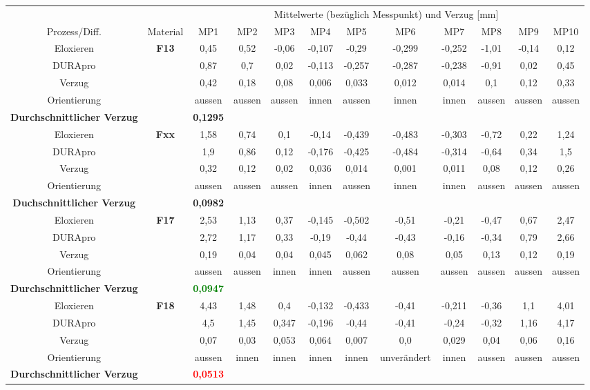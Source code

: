 \documentclass[12pt,a4paper,parskip,twoside,BCOR5mm,headsepline]{scrartcl}
\begin{document}
\begin{description*}
\begin{table}
\begin{tabular}{cccccccccccc}
\toprule
&& \multicolumn{10}{c}{Mittelwerte (bezüglich Messpunkt) und Verzug [\si{\milli\meter}]} \\
\cmidrule(2){3-12}
Prozess/Diff. & Material & MP1 & MP2 & MP3 & MP4 & MP5 & MP6 & MP7 & MP8 & MP9 & MP10 \\
\midrule
Eloxieren & \textbf{F13} &0,45 &0,52  &-0,06  &-0,107  &-0,29  &-0,299  &-0,252  &-1,01  &-0,14  &0,12  \\
DURApro &&0,87  &0,7  &0,02  &-0,113  &-0,257  & -0,287 &-0,238  &-0,91  &0,02  &0,45  \\
Verzug &&0,42  & 0,18 &0,08  &0,006  &0,033  &0,012  &0,014  &0,1  & 0,12 &0,33  \\
Orientierung &&aussen &aussen  &aussen  &innen  & aussen &innen  & innen &aussen  &aussen  &aussen  \\
\textbf{Durchschnittlicher Verzug} &&\textbf{0,1295}&&&&&&&&&\\
\midrule
Eloxieren & \textbf{Fxx} & 1,58 & 0,74 &0,1  &-0,14  &-0,439  &-0,483  &-0,303  &-0,72  &0,22  &1,24 \\
DURApro &&1,9  &0,86  & 0,12 &-0,176  &-0,425  &-0,484  & -0,314 &-0,64  & 0,34 & 1,5 \\
Verzug &&0,32  &0,12  & 0,02 &0,036  &0,014  &0,001  &0,011  & 0,08 & 0,12 & 0,26 \\
Orientierung &&aussen  &aussen  &aussen  & innen & aussen & innen &innen  &aussen  & aussen &aussen  \\
\textbf{Duchschnittlicher Verzug} && \textbf{0,0982}&&&&&&&&&\\
\midrule
Eloxieren & \textbf{F17} &2,53  &1,13  &0,37  &-0,145  &-0,502  &-0,51  & -0,21 &-0,47  &0,67  & 2,47 \\
DURApro &&2,72  &1,17  &0,33  &-0,19  &-0,44   &-0,43   &-0,16   & -0,34 & 0,79 & 2,66  \\
Verzug && 0,19 & 0,04 &0,04  & 0,045 &0,062  &0,08  &0,05   & 0,13 &0,12  &0,19  \\
Orientierung && aussen &aussen  &innen &innen  & aussen & aussen &aussen  &aussen  & aussen &aussen  \\
\textbf{Durchschnittlicher Verzug} && \textbf{\textcolor{green}{0,0947}} &&&&&&&&&\\
\midrule
Eloxieren & \textbf{F18} &4,43  &1,48  &0,4  & -0,132 & -0,433 &-0,41  & -0,211 &-0,36  &1,1  & 4,01  \\
DURApro &&4,5  &1,45  & 0,347 & -0,196  &-0,44  &-0,41  &-0,24  &-0,32 &1,16  & 4,17 \\
Verzug && 0,07 &0,03  &0,053  &0,064  &0,007  &0,0  & 0,029 & 0,04 &0,06  & 0,16 \\
Orientierung && aussen &innen  &innen  & innen & innen &unverändert  & innen &aussen  &aussen  & aussen \\
\textbf{Durchschnittlicher Verzug} && \textbf{\textcolor{red}{0,0513}} &&&&&&&&&\\
\bottomrule


\end{tabular}
\end{table}
\end{description*}
\end{document}
